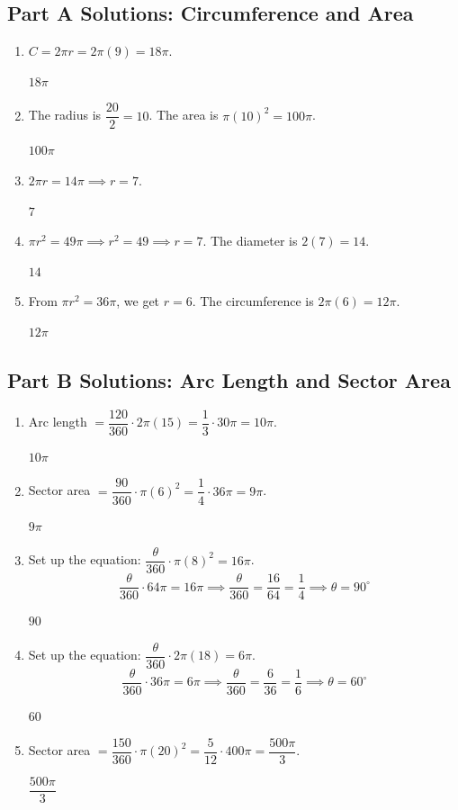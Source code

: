 \documentclass[14pt]{extarticle}
\begin{document}
\subsection*{Part A Solutions: Circumference and Area}
\begin{enumerate}
  \item \(C = 2\pi r = 2\pi(9) = 18\pi\).

  \(\boxed{18\pi}\)

  \item The radius is \(\dfrac{20}{2} = 10\). The area is \(\pi(10)^2 = 100\pi\).

  \(\boxed{100\pi}\)

  \item \(2\pi r = 14\pi \implies r = 7\).

  \(\boxed{7}\)

  \item \(\pi r^2 = 49\pi \implies r^2 = 49 \implies r = 7\). The diameter is \(2(7) = 14\).

  \(\boxed{14}\)

  \item From \(\pi r^2 = 36\pi\), we get \(r = 6\). The circumference is \(2\pi(6) = 12\pi\).

  \(\boxed{12\pi}\)
\end{enumerate}

\subsection*{Part B Solutions: Arc Length and Sector Area}
\begin{enumerate}
  \item Arc length \(= \dfrac{120}{360} \cdot 2\pi(15) = \dfrac{1}{3} \cdot 30\pi = 10\pi\).

  \(\boxed{10\pi}\)

  \item Sector area \(= \dfrac{90}{360} \cdot \pi(6)^2 = \dfrac{1}{4} \cdot 36\pi = 9\pi\).

  \(\boxed{9\pi}\)

  \item Set up the equation: \(\dfrac{\theta}{360} \cdot \pi(8)^2 = 16\pi\).
  \[
  \frac{\theta}{360} \cdot 64\pi = 16\pi \implies \frac{\theta}{360} = \frac{16}{64} = \frac{1}{4} \implies \theta = 90^\circ
  \]

  \(\boxed{90}\)

  \item Set up the equation: \(\dfrac{\theta}{360} \cdot 2\pi(18) = 6\pi\).
  \[
  \frac{\theta}{360} \cdot 36\pi = 6\pi \implies \frac{\theta}{360} = \frac{6}{36} = \frac{1}{6} \implies \theta = 60^\circ
  \]

  \(\boxed{60}\)

  \item Sector area \(= \dfrac{150}{360} \cdot \pi(20)^2 = \dfrac{5}{12} \cdot 400\pi = \dfrac{500\pi}{3}\).

  \(\boxed{\dfrac{500\pi}{3}}\)
\end{enumerate}
\end{document}

